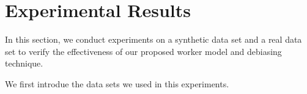 \section{Experimental Results}
\label{sec:exp}

In this section, we conduct experiments on a synthetic data set and a real data set 
to verify the effectiveness of our proposed worker model and debiasing technique.  

We first introdue the data sets we used in this experiments.  


